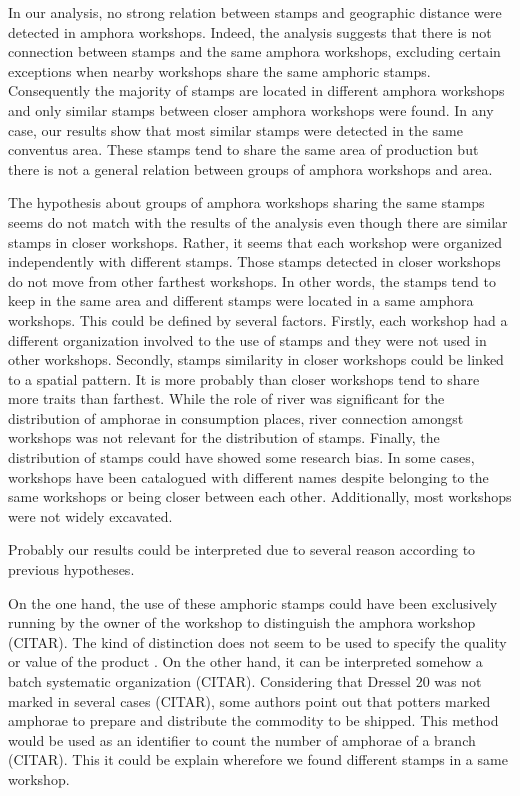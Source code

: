 \documentclass[review]{elsarticle}
\begin{document}
In our analysis, no strong relation between stamps and geographic distance were detected in amphora workshops. Indeed, the analysis suggests that there is not connection between stamps and the same amphora workshops, excluding certain exceptions when nearby workshops share the same amphoric stamps. Consequently the majority of stamps are located in different amphora workshops and only similar stamps between closer amphora workshops were found. In any case, our results show that most similar stamps were detected in the same conventus area. These stamps tend to share the same area of production but there is not a general relation between groups of amphora workshops and area. 

The hypothesis about groups of amphora workshops sharing the same stamps seems do not match with the results of the analysis even though there are similar stamps in closer workshops. Rather, it seems that each workshop were organized independently with different stamps. Those stamps detected in closer workshops do not move from other farthest workshops. In other words, the stamps tend to keep in the same area and different stamps were located in a same amphora workshops. 
This could be defined by several factors. Firstly, each workshop had a different organization involved to the use of stamps and they were not used in other workshops. Secondly, stamps similarity in closer workshops could be linked to a spatial pattern. It is more probably than closer workshops tend to share more traits than farthest. While the role of river was significant for the distribution of amphorae in consumption places, river connection amongst workshops was not relevant for the distribution of stamps. Finally, the distribution of stamps could have showed some research bias. In some cases, workshops have been catalogued with different names despite belonging to the same workshops or being closer between each other. Additionally, most workshops were not widely excavated. 




Probably our results could be interpreted due to several reason according to previous hypotheses. 


On the one hand, the use of these amphoric stamps could have been exclusively running by the owner of the workshop to distinguish the amphora workshop (CITAR). The kind of distinction does not seem to be used to specify the quality or value of the product \citep{callender}. 
On the other hand, it can be interpreted somehow a batch systematic organization (CITAR). Considering that Dressel 20 was not marked in several cases (CITAR), some authors point out that potters marked amphorae to prepare and distribute the commodity to be shipped. This method would be used as an identifier to count the number of amphorae of a branch (CITAR). This it could be explain wherefore we found different stamps in a same workshop. 
\end{document}

